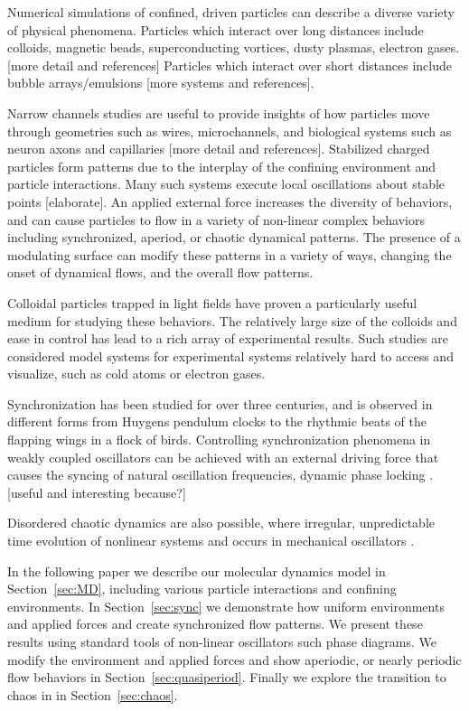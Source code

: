 \documentclass[prb,preprint]{revtex4}
\begin{document}
Numerical simulations of confined, driven particles
can describe a diverse variety of physical phenomena.
Particles which interact over long distances
include colloids, magnetic beads, superconducting vortices, dusty plasmas, electron gases. [more detail and references]
Particles which interact over short distances include
bubble arrays/emulsions [more systems and references].

Narrow channels studies are useful to provide insights 
of how particles move through geometries
such as wires, microchannels, and biological systems such as neuron axons and capillaries [more detail and references].
Stabilized charged particles form patterns
due to the interplay of the confining environment
and particle interactions.
Many such systems execute local oscillations
about stable points [elaborate].
%
An applied external force
increases the diversity of behaviors,
and can cause particles to flow in
a variety of non-linear complex behaviors
including
synchronized, aperiod, or chaotic dynamical patterns.
%
The presence of a modulating surface
can modify these patterns in a variety of ways,
changing the onset of dynamical flows,
and the overall flow patterns.

Colloidal particles trapped in light fields have proven
a particularly useful medium for studying these behaviors.%
The relatively large size of the colloids
and ease in control has lead to a rich array of 
experimental results. %
Such studies are considered model systems
for experimental systems relatively hard to access and visualize,
such as cold atoms or electron gases. %


Synchronization has been studied for over three centuries,
and is observed in different forms
from Huygens pendulum clocks
to the rhythmic beats of the flapping wings in a flock of birds.
Controlling
synchronization phenomena in weakly coupled oscillators
can be achieved with an external driving force
that causes the syncing of natural oscillation frequencies,
dynamic phase locking \cite{juniper2015}.
[useful and interesting because?]

Disordered chaotic dynamics are also possible,
where irregular, unpredictable time evolution of
nonlinear systems and occurs in mechanical oscillators \cite{chaos}.

In the following paper we describe
our molecular dynamics model in Section~\ref{sec:MD},
including various particle interactions and confining environments.
In Section~\ref{sec:sync} we
demonstrate how uniform environments and applied forces
and create synchronized flow patterns.
We present these results using standard tools of non-linear oscillators
such phase diagrams.
We modify the environment and applied forces
and show aperiodic, or nearly periodic flow behaviors
in Section~\ref{sec:quasiperiod}.
Finally we explore the transition to chaos in 
in Section~\ref{sec:chaos}.
\end{document}
